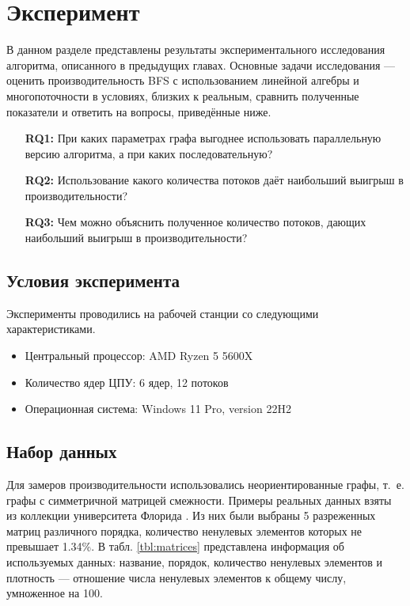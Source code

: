 
\section{Эксперимент}

В данном разделе представлены результаты экспериментального исследования алгоритма, описанного в предыдущих главах. Основные задачи исследования --- оценить производительность BFS с использованием линейной алгебры и многопоточности в условиях, близких к реальным, сравнить полученные показатели и ответить на вопросы, приведённые ниже.

\begin{itemize}
    \item[\textbf{RQ1:}] При каких параметрах графа выгоднее использовать параллельную версию алгоритма, а при каких последовательную?
    \item[\textbf{RQ2:}] Использование какого количества потоков даёт наибольший выигрыш в производительности?
    \item[\textbf{RQ3:}] Чем можно объяснить полученное количество потоков, дающих наибольший выигрыш в производительности?
\end{itemize}

\subsection{Условия эксперимента}

Эксперименты проводились на рабочей станции со следующими характеристиками.
\begin{itemize}
    \item Центральный процессор: AMD Ryzen 5 5600X 
    \item Количество ядер ЦПУ: 6 ядер, 12 потоков 
    \item Операционная система: Windows 11 Pro, version 22H2
\end{itemize}

\subsection{Набор данных}

Для замеров производительности использовались неориентированные графы, т.~е. графы с симметричной матрицей смежности. Примеры реальных данных взяты из коллекции университета Флорида \cite{10.1145/2049662.2049663}. Из них были выбраны 5 разреженных матриц различного порядка, количество ненулевых элементов которых не превышает 1.34\%. В табл. \ref{tbl:matrices} представлена информация об используемых данных: название, порядок, количество ненулевых элементов и плотность --- отношение числа ненулевых элементов к общему числу, умноженное на 100.

